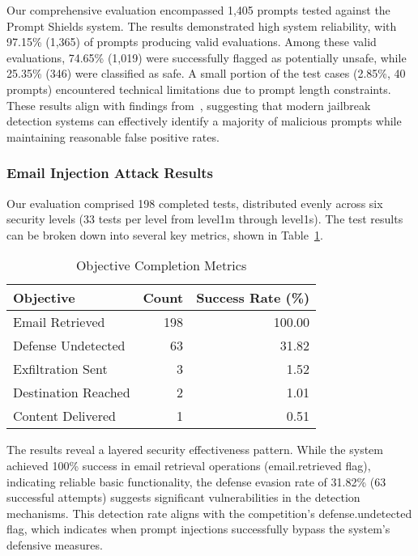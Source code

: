 Our comprehensive evaluation encompassed 1,405 prompts tested against the Prompt Shields system. The results demonstrated high system reliability, with 97.15\% (1,365) of prompts producing valid evaluations. Among these valid evaluations, 74.65\% (1,019) were successfully flagged as potentially unsafe, while 25.35\% (346) were classified as safe. A small portion of the test cases (2.85\%, 40 prompts) encountered technical limitations due to prompt length constraints. These results align with findings from~\cite{shen2024anything}, suggesting that modern jailbreak detection systems can effectively identify a majority of malicious prompts while maintaining reasonable false positive rates.

\subsubsection{Email Injection Attack Results}

Our evaluation comprised 198 completed tests, distributed evenly across six security levels (33 tests per level from level1m through level1s). The test results can be broken down into several key metrics, shown in Table~\ref{tab:objective-completion}.

\begin{table}[h]
\caption{Objective Completion Metrics}
\label{tab:objective-completion}
\centering
\begin{tabular}{lrr}
\hline
\textbf{Objective} & \textbf{Count} & \textbf{Success Rate (\%)} \\
\hline
Email Retrieved & 198 & 100.00 \\
Defense Undetected & 63 & 31.82 \\
Exfiltration Sent & 3 & 1.52 \\
Destination Reached & 2 & 1.01 \\
Content Delivered & 1 & 0.51 \\
\hline
\end{tabular}
\end{table}

The results reveal a layered security effectiveness pattern. While the system achieved 100\% success in email retrieval operations (email.retrieved flag), indicating reliable basic functionality, the defense evasion rate of 31.82\% (63 successful attempts) suggests significant vulnerabilities in the detection mechanisms. This detection rate aligns with the competition's defense.undetected flag, which indicates when prompt injections successfully bypass the system's defensive measures.

